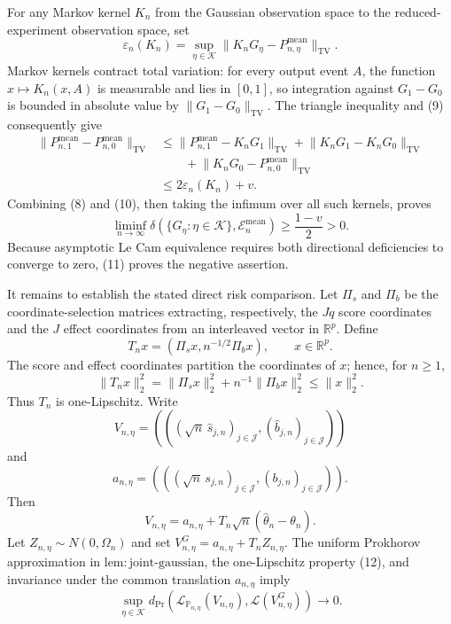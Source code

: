 For any Markov kernel \(K_n\) from the Gaussian observation space to the reduced-experiment observation space, set
\[
 \varepsilon_n(K_n)=
 \sup_{\eta\in\mathcal K}
 \lVert K_nG_\eta-P^{\mathrm{mean}}_{n,\eta}\rVert_{\mathrm{TV}}.
\]
Markov kernels contract total variation: for every output event \(A\), the function \(x\mapsto K_n(x,A)\) is measurable and lies in \([0,1]\), so integration against \(G_1-G_0\) is bounded in absolute value by \(\lVert G_1-G_0\rVert_{\mathrm{TV}}\). The triangle inequality and (9) consequently give
\[
 \begin{aligned}
 \lVert P^{\mathrm{mean}}_{n,1}-P^{\mathrm{mean}}_{n,0}\rVert_{\mathrm{TV}}
 &\leq
 \lVert P^{\mathrm{mean}}_{n,1}-K_nG_1\rVert_{\mathrm{TV}}
 +\lVert K_nG_1-K_nG_0\rVert_{\mathrm{TV}}\\
 &\qquad
 +\lVert K_nG_0-P^{\mathrm{mean}}_{n,0}\rVert_{\mathrm{TV}}\\
 &\leq2\varepsilon_n(K_n)+v.
 \end{aligned}
 \tag{10}
\]
Combining (8) and (10), then taking the infimum over all such kernels, proves
\[
 \liminf_{n\to\infty}
 \delta\!\left(\{G_\eta:\eta\in\mathcal K\},
                 \mathcal E_n^{\mathrm{mean}}\right)
 \geq\frac{1-v}{2}>0.
 \tag{11}
\]
Because asymptotic Le Cam equivalence requires both directional deficiencies to converge to zero, (11) proves the negative assertion.

It remains to establish the stated direct risk comparison. Let \(\Pi_s\) and \(\Pi_b\) be the coordinate-selection matrices extracting, respectively, the \(Jq\) score coordinates and the \(J\) effect coordinates from an interleaved vector in \(\mathbb R^p\). Define
\[
 T_nx=(\Pi_sx,n^{-1/2}\Pi_bx),
 \qquad x\in\mathbb R^p.
\]
The score and effect coordinates partition the coordinates of \(x\); hence, for \(n\geq1\),
\[
 \lVert T_nx\rVert_2^2
 =\lVert\Pi_sx\rVert_2^2+n^{-1}\lVert\Pi_bx\rVert_2^2
 \leq\lVert x\rVert_2^2.
 \tag{12}
\]
Thus \(T_n\) is one-Lipschitz. Write
\[
 V_{n,\eta}
 =\left(((\sqrt n\,\widehat s_{j,n})_{j\in\mathcal J},
          (\widehat b_{j,n})_{j\in\mathcal J})\right)
\]
and
\[
 a_{n,\eta}
 =\left(((\sqrt n\,s_{j,n})_{j\in\mathcal J},
          (b_{j,n})_{j\in\mathcal J})\right).
\]
Then
\[
 V_{n,\eta}
 =a_{n,\eta}+T_n\sqrt n(\widehat\theta_n-\theta_n).
 \tag{13}
\]
Let \(Z_{n,\eta}\sim N(0,\Omega_n)\) and set \(V^G_{n,\eta}=a_{n,\eta}+T_nZ_{n,\eta}\). The uniform Prokhorov approximation in \(\mathrm{lem:joint\text{-}gaussian}\), the one-Lipschitz property (12), and invariance under the common translation \(a_{n,\eta}\) imply
\[
 \sup_{\eta\in\mathcal K}
 d_{\mathrm{Pr}}\!\left(
   \mathcal L_{\mathbb P_{n,\eta}}(V_{n,\eta}),
   \mathcal L(V^G_{n,\eta})
 \right)
 \longrightarrow0.
 \tag{14}
\]

